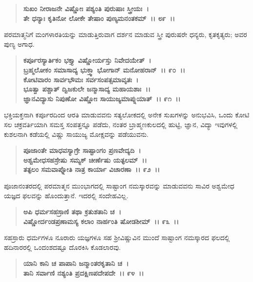 \begin{verse}
\textbf{ಸುಖಂ ನೀರಾಜನೇ ವಿಷ್ಣೋಃ ಪಶ್ಯಂತಿ ಪುರುಷಾಃ ಸ್ತ್ರೀಯಃ~।}\\\textbf{ತೇ ಧನ್ಯಾಃ ಕೃತಿನೋ ಲೋಕೇ ತೇಷಾಂ ಪುಣ್ಯಮನಂತಕಮ್~।। ೮೯~।।}
\end{verse}

ಪರಮಾತ್ಮನಿಗೆ ಮಂಗಳಾರತಿಯನ್ನು ಮಾಡುತ್ತಿರುವಾಗ ದರ್ಶನ ಮಾಡುವ ಸ್ತ್ರೀ ಪುರುಷರೇ ಧನ್ಯರು, ಕೃತಕೃತ್ಯರು; ಅವರ ಪುಣ್ಯ ಅಗಾಧ.

\begin{verse}
\textbf{ಕರ್ಪೂರಸ್ಯಾರ್ತಿಕಂ ಭಕ್ತ್ಯಾ ವಿಷ್ಣೋರ್ಯಸ್ತು ನಿವೇದಯೇತ್~।}\\\textbf{ಬ್ರಹ್ಮಲೋಕಂ ಸಮಾಸಾದ್ಯ ಭುಕ್ತ್ವಾ ಭೋಗಾನ್ ಮನೋಹರಾನ್~।। ೯೦~।। }\\\textbf{ಕೋಟಿವಾರಂ ಸಾರ್ವಭೌಮಃ ಸರ್ವಸಂಪತ್ಸಮಾವೃತಃ~।}\\\textbf{ಭೂತ್ವಾ ಪಶ್ಚಾತ್ ದ್ವಿಜಕುಲೇ ಜನ್ಮಾಸಾದ್ಯ ಮಹಾಯಶಾಃ~।।} \\\textbf{ಜ್ಞಾನವಿದ್ಯಾಸು ನಿಪುಣೋ ವಿಷ್ಣೋಃ ಸಾಯುಜ್ಯಮಾಪ್ನುಯಾತ್~।। ೯೧~।।}
\end{verse}

ಭಕ್ತಿಯಕ್ತನಾಗಿ ಕರ್ಪೂರದಿಂದ ಆರತಿ ಮಾಡುವವನು ಸತ್ಯಲೋಕದಲ್ಲಿ ಅನೇಕ ಸುಖಗಳನ್ನು ಅನುಭವಿಸಿ, ಒಂದು ಕೋಟಿ ಸಲ ಚಕ್ರವರ್ತಿಯಾಗಿ ಸಮಸ್ತ ಸಂಪತ್ತನ್ನೂ ಪಡೆದು, ನಂತರ ಬ್ರಾಹ್ಮಣಕುಲದಲ್ಲಿ ಹುಟ್ಟಿ, ಜ್ಞಾನ, ವಿದ್ಯಾ ಇವುಗಳಲ್ಲಿ ಕುಶಲನಾಗಿ ಕಡೆಯಲ್ಲಿ ವಿಷ್ಣು ಸಾಯುಜ್ಯ ಮೋಕ್ಷವನ್ನು ಪಡೆಯುವನು.

\begin{verse}
\textbf{ಪೂಜಾಂತೇ ಮಾಧವಸ್ಯಾಗ್ರೇ ಸಾಷ್ಟಾಂಗಂ ಪ್ರಣವೇದ್ಯದಿ~।}\\\textbf{ಅಶ್ವಮೇಧಸಹಸ್ರೇಷು ಸಮ್ಯಕ್ ಚೀರ್ಣೆಷು ಯತ್ಫಲಮ್~।।}\\\textbf{ತತ್ಫಲಂ ಸಮವಾಪ್ನೋತಿ ನಾತ್ರ ಕಾರ್ಯಾ ವಿಚಾರಣಾ~।। ೯೨~।।}
\end{verse}

ಪೂಜಾನಂತರದಲ್ಲಿ ಪರಮಾತ್ಮನ ಮುಂಭಾಗದಲ್ಲಿ ಸಾಷ್ಟಾಂಗ ನಮಸ್ಕಾರವನ್ನು ಮಾಡುವವನು ಸಾವಿರ ಅಶ್ವಮೇಧ ಯಜ್ಞದ ಫಲವನ್ನು ಹೊಂದುತ್ತಾನೆ. ಇದರಲ್ಲಿ ಸಂದೇಹವಿಲ್ಲ.

\begin{verse}
\textbf{ಅಪಿ ಧರ್ಮಸಹಸ್ರಾಣಿ ತಥಾ ಕ್ರತುಶತಾನಿ ಚ~।}\\\textbf{ವಿಷ್ಣೋರ್ದಂಡಪ್ರಣಾಮಸ್ಯ ಕಲಾಂ ನಾರ್ಹಂತಿ ಷೋಡಶೀಮ್~।। ೯೩~।।}
\end{verse}

ಸಹಸ್ರಾರು ಧರ್ಮಗಳೂ ನೂರಾರು ಯಜ್ಞಗಳೂ ಸಹ ಶ‍್ರೀವಿಷ್ಣುವಿನ ಮುಂದೆ ಸಾಷ್ಟಾಂಗ ನಮಸ್ಕಾರದ ಫಲದಲ್ಲಿ ಹದಿನಾರರಲ್ಲಿ ಒಂದಂಶದಷ್ಟೂ ದೊರಕಿಸಿ ಕೊಡಲಾರವು.

\begin{verse}
\textbf{ಯಾನಿ ಕಾನಿ ಚ ಪಾಪಾನಿ ಜನ್ಮಾಂತರಕೃತಾನಿ ಚ~।}\\\textbf{ತಾನಿ ಸರ್ವಾಣಿ ನಶ್ಯಂತಿ ಪ್ರದಕ್ಷಿಣಪದೇಪದೇ~।। ೯೪~।। }
\end{verse}


